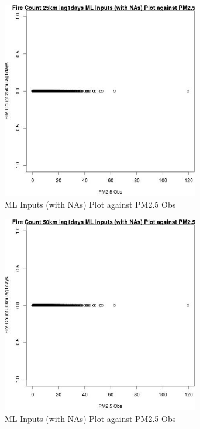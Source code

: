 \begin{figure} 
\centering  
\includegraphics[width=0.77\textwidth]{Code_Outputs/Report_ML_input_PM25_Step4_part_e_de_duplicated_aves_compiled_2019-05-18wNAs_Fire_Count_25km_lag1daysvPM25_Obs.jpg} 
\caption{\label{fig:Report_ML_input_PM25_Step4_part_e_de_duplicated_aves_compiled_2019-05-18wNAsFire_Count_25km_lag1daysvPM25_Obs}ML Inputs (with NAs) Plot against PM2.5 Obs} 
\end{figure} 
 

\begin{figure} 
\centering  
\includegraphics[width=0.77\textwidth]{Code_Outputs/Report_ML_input_PM25_Step4_part_e_de_duplicated_aves_compiled_2019-05-18wNAs_Fire_Count_50km_lag1daysvPM25_Obs.jpg} 
\caption{\label{fig:Report_ML_input_PM25_Step4_part_e_de_duplicated_aves_compiled_2019-05-18wNAsFire_Count_50km_lag1daysvPM25_Obs}ML Inputs (with NAs) Plot against PM2.5 Obs} 
\end{figure} 
 

